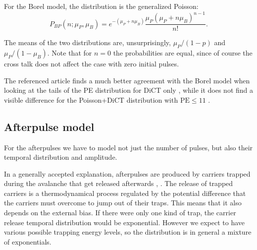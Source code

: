 For the Borel model, the distribution is the generalized Poisson:
%
\begin{equation}
    P_{BP}(n;\mu_P,\mu_B)
    = e^{-(\mu_P + n\mu_B)} \frac {\mu_P(\mu_P + n\mu_B)^{n-1}} {n!}.
    \label{eq:genpoisson}
\end{equation}

The means of the two distributions are, unsurprisingly, $\mu_P/(1-p)$ and
$\mu_P/(1-\mu_B)$. Note that for $n = 0$ the probabilities are equal, since
of course the cross talk does not affect the case with zero initial pulses.

The referenced article finds a much better agreement with the Borel model when
looking at the tails of the PE distribution for DiCT only
\cite[p.~3~fig.~1]{vinogradov2012}, while it does not find a visible difference
for the Poisson+DiCT distribution with $\text{PE} \le 11$
\cite[p.~4~fig.~2]{vinogradov2012}.

\subsection{Afterpulse model}
\label{sec:aptheory}

For the afterpulses we have to model not just the number of pulses, but also
their temporal distribution and amplitude.

In a generally accepted explanation, afterpulses are produced by carriers
trapped during the avalanche that get released afterwards \cite{nagy2014},
\cite{cova1991}. The release of trapped carriers is a thermodynamical process
regulated by the potential difference that the carriers must overcome to jump
out of their traps. This means that it also depends on the external bias. If
there were only one kind of trap, the carrier release temporal distribution
would be exponential. However we expect to have various possible trapping
energy levels, so the distribution is in general a mixture of exponentials.

